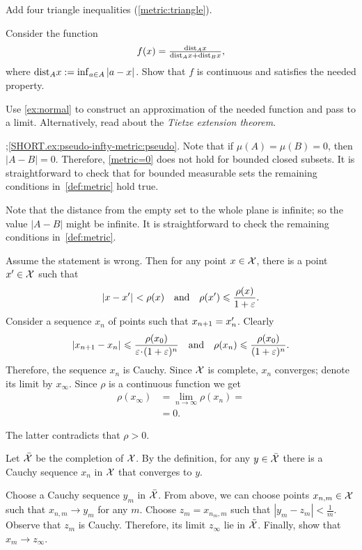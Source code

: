 Add four triangle inequalities (\ref{metric:triangle}).

Consider the function 
\[f(x)=\tfrac{\mathrm{dist}_Ax}{\mathrm{dist}_Ax+\mathrm{dist}_Bx},\]
where $\distfun_Ax\z\df\inf_{a\in A}\dist{a}{x}{}$.
Show that $f$ is continuous and satisfies the needed property.

Use \ref{ex:normal} to construct an approximation of the needed function and pass to a limit.
Alternatively, read about the \textit{Tietze extension theorem}.

\parbf{\ref{ex:pseudo-infty-metric}};\ref{SHORT.ex:pseudo-infty-metric:pseudo}.
Note that if $\mu(A)=\mu(B)=0$, then $|A-B|=0$.
Therefore, \ref{metric=0} does not hold for bounded closed subsets.
It is straightforward to check that for bounded measurable sets the remaining conditions in~\ref{def:metric} hold true.


Note that the distance from the empty set to the whole plane is infinite; so the value $|A-B|$ might be infinite.
It is straightforward to check the remaining conditions in~\ref{def:metric}.

Assume the statement is wrong. 
Then for any point $x\in \mathcal{X}$, there is a point $x'\in \mathcal{X}$ such that 
\[\dist{x}{x'}{}< \rho(x)
\quad\text{and}\quad
\rho(x')\le\frac{\rho(x)}{1+\eps}.\]
Consider a sequence $x_n$ of points such that $x_{n+1}\z=x_n'$.
Clearly
\[\dist{x_{n+1}}{x_n}{}
\le
\frac{\rho(x_0)}{\eps\cdot(1+\eps)^n}
\quad\hbox{and}\quad
\rho(x_n)\le \frac{\rho(x_0)}{(1+\eps)^n}.\] 
Therefore, the sequence $x_n$ is Cauchy.
Since $\mathcal{X}$ is complete, $x_n$ converges;
denote its limit by $x_\infty$.
Since $\rho$ is a continuous function we get
\begin{align*}\rho(x_\infty)&=\lim_{n\to\infty}\rho(x_n)=
\\&=0.
\end{align*}

The latter contradicts that $\rho>0$.

Let $\bar {\mathcal{X}}$ be the completion of $\mathcal{X}$.
By the definition, for any $y\in \bar {\mathcal{X}}$ there is a Cauchy sequence $x_n$ in  $\mathcal{X}$ that converges to $y$.

Choose a Cauchy sequence $y_m$ in $\bar {\mathcal{X}}$.
From above, we can choose points $x_{n,m}\in \mathcal{X}$ such that $x_{n,m}\to y_m$ for any $m$.
Choose $z_m=x_{n_m,m}$ such that $|y_m-z_m|<\tfrac1m$.
Observe that $z_m$ is Cauchy.
Therefore, its limit $z_\infty$ lie in $\bar{\mathcal{X}}$.
Finally, show that $x_m\to z_\infty$.

